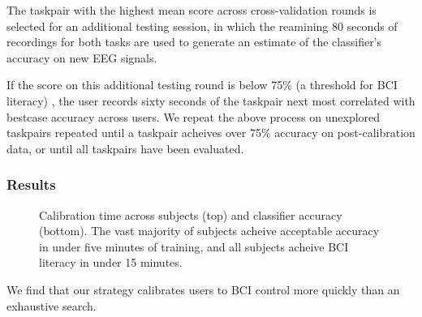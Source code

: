 The taskpair with the highest mean score across cross-validation rounds is selected for an additional testing session, in which the reamining 80 seconds of recordings for both tasks are used to generate an estimate of the classifier's accuracy on new EEG signals.

If the score on this additional testing round is below 75\% (a threshold for BCI literacy) \cite{vidaurre_towards_2010}, the user records sixty seconds of the taskpair next most correlated with bestcase accuracy across users. We repeat the above process on unexplored taskpairs repeated until a taskpair acheives over 75\% accuracy on post-calibration data, or until all taskpairs have been evaluated.

\subsubsection{Results}

\begin{figure}[!h]
  \vspace{-0.2cm}
  \centering
   {}
  \caption{Calibration time across subjects (top) and classifier accuracy (bottom). The vast majority of subjects acheive acceptable accuracy in under five minutes of training, and all subjects acheive BCI literacy in under 15 minutes. }
  \label{fig:fig2}
  \vspace{-0.1cm}
\end{figure}

We find that our strategy calibrates users to BCI control more quickly than an exhaustive search.




